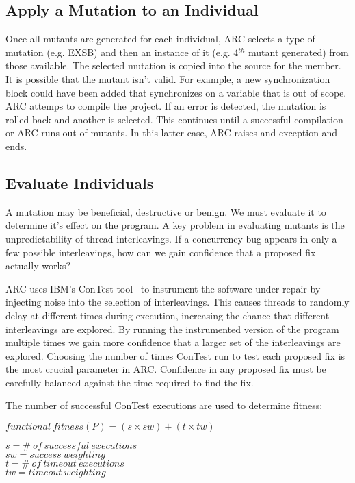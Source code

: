 \documentclass{llncs}
\begin{document}
\subsection{Apply a Mutation to an Individual}
\label{sec:mutate_individuals}

Once all mutants are generated for each individual, ARC selects a type of mutation (e.g. EXSB) and then an instance of it (e.g. 4$^{th}$ mutant generated) from those available. The selected mutation is copied into the source for the member. It is possible that the mutant isn't valid. For example, a new synchronization block could have been added that synchronizes on a variable that is out of scope. ARC attemps to compile the project.  If an error is detected, the mutation is rolled back and another is selected. This continues until a successful compilation or ARC runs out of mutants. In this latter case, ARC raises and exception and ends.

\subsection{Evaluate Individuals}
\label{sec:evalute_individuals}

A mutation may be beneficial, destructive or benign. We must evaluate it to determine it's effect on the program. A key problem in evaluating mutants is the unpredictability of thread interleavings. If a concurrency bug appears in only a few possible interleavings, how can we gain confidence that a proposed fix actually works? 

ARC uses IBM's ConTest tool~\cite{EFN+02} to instrument the software under repair by injecting noise into the selection of interleavings. This causes threads to randomly delay at different times during execution, increasing the chance that different interleavings are explored. By running the instrumented version of the program multiple times we gain more confidence that a larger set of the interleavings are explored. Choosing the number of times ConTest run to test each proposed fix is the most crucial parameter in ARC.  Confidence in any proposed fix must be carefully balanced against the time required to find the fix.

The number of successful ConTest executions are used to determine fitness:
\newline
\begin{footnotesize}
\begin{center}
$functional\ fitness(P) = (s \times sw) + (t \times tw)$
\end{center}
\end{footnotesize}
\begin{scriptsize}
\begin{center}
$s = \#\ of\ successful\ executions$ \\
$sw = success\ weighting$ \\
$t = \#\ of\ timeout\ executions$ \\
$tw = timeout\ weighting$
\end{center}
\end{scriptsize}
\end{document}
